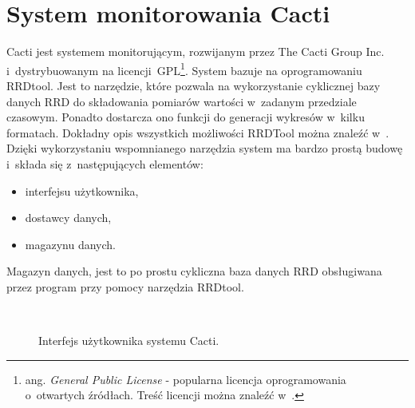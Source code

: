 \section[Cacti][System monitorowania Cacti]{System monitorowania Cacti}

Cacti\cite{www:Cacti} jest systemem monitorującym, rozwijanym przez The Cacti Group
Inc. i~dystrybuowanym na licencji~GPL\footnote{ ang. {\em General
    Public License} - popularna licencja oprogramowania o~otwartych
  źródłach. Treść licencji można znaleźć w~\cite{www:GPLv2}.}. System
bazuje na oprogramowaniu RRDtool\cite{www:RRDtool}. Jest to narzędzie,
które pozwala na wykorzystanie cyklicznej bazy danych RRD do
składowania pomiarów wartości w~zadanym przedziale czasowym. Ponadto
dostarcza ono funkcji do generacji wykresów w~kilku
formatach. Dokładny opis wszystkich możliwości RRDTool można znaleźć
w~\cite{www:RRDtool}. Dzięki wykorzystaniu wspomnianego narzędzia
system ma bardzo prostą budowę i~składa się z~następujących elementów:

\begin{itemize}
\item interfejsu użytkownika,
\item dostawcy danych,
\item magazynu danych.
\end{itemize}

Magazyn danych, jest to po prostu cykliczna baza danych RRD
obsługiwana przez program przy pomocy narzędzia RRDtool.

\begin{figure}[h]
\label{fig:CactiInterface}
\caption{Interfejs użytkownika systemu Cacti.}
\begin{center}
\\[0.1cm]
\end{center}
\end{figure}

